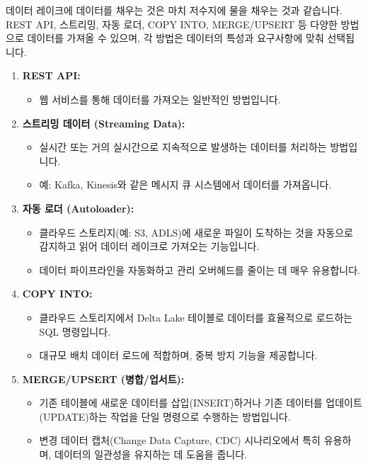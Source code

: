 \documentclass[11pt,a4paper]{article}
\theoremstyle{definition}
\begin{document}
\begin{summarybox}[title=핵심 요약: 데이터 레이크에 물 채우기]
데이터 레이크에 데이터를 채우는 것은 마치 저수지에 물을 채우는 것과 같습니다. REST API, 스트리밍, 자동 로더, COPY INTO, MERGE/UPSERT 등 다양한 방법으로 데이터를 가져올 수 있으며, 각 방법은 데이터의 특성과 요구사항에 맞춰 선택됩니다.
\end{summarybox}

\begin{enumerate}
    \item \textbf{REST API:}
    \begin{itemize}
        \item 웹 서비스를 통해 데이터를 가져오는 일반적인 방법입니다.
    \end{itemize}
    \item \textbf{스트리밍 데이터 (Streaming Data):}
    \begin{itemize}
        \item 실시간 또는 거의 실시간으로 지속적으로 발생하는 데이터를 처리하는 방법입니다.
        \item 예: Kafka, Kinesis와 같은 메시지 큐 시스템에서 데이터를 가져옵니다.
    \end{itemize}
    \item \textbf{자동 로더 (Autoloader):}
    \begin{itemize}
        \item 클라우드 스토리지(예: S3, ADLS)에 새로운 파일이 도착하는 것을 자동으로 감지하고 읽어 데이터 레이크로 가져오는 기능입니다.
        \item 데이터 파이프라인을 자동화하고 관리 오버헤드를 줄이는 데 매우 유용합니다.
    \end{itemize}
    \item \textbf{COPY INTO:}
    \begin{itemize}
        \item 클라우드 스토리지에서 Delta Lake 테이블로 데이터를 효율적으로 로드하는 SQL 명령입니다.
        \item 대규모 배치 데이터 로드에 적합하며, 중복 방지 기능을 제공합니다.
    \end{itemize}
    \item \textbf{MERGE/UPSERT (병합/업서트):}
    \begin{itemize}
        \item 기존 테이블에 새로운 데이터를 삽입(INSERT)하거나 기존 데이터를 업데이트(UPDATE)하는 작업을 단일 명령으로 수행하는 방법입니다.
        \item 변경 데이터 캡처(Change Data Capture, CDC) 시나리오에서 특히 유용하며, 데이터의 일관성을 유지하는 데 도움을 줍니다.
    \end{itemize}
\end{enumerate}
\end{document}
